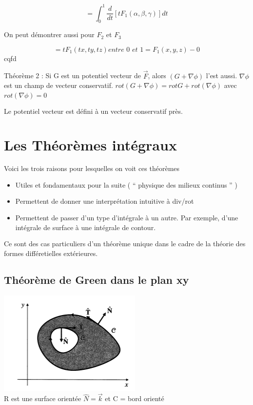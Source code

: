 \[=\int_0^1 \frac{d}{dt}[t F_1 ( \alpha, \beta, \gamma ) ] dt \]

On peut démontrer aussi pour $F_2 $ et $F_3$

\[ = tF_1 ( tx,ty,tz) \textit{entre 0 et 1} = F_1 (x,y,z) - 0\]
cqfd

\begin{myrem}

Théorème 2 : Si G est un potentiel vecteur de $\vec F$, alors $(G+\nabla \phi )$ l'est aussi. $\nabla \phi$ est un champ de vecteur conservatif.
$rot ( G+\nabla \phi )  = rot G + rot ( \nabla  \phi )$ avec $rot ( \nabla  \phi )=0$
\end{myrem}


Le potentiel vecteur est défini à un vecteur conservatif près.

\section{Les Théorèmes intégraux}


Voici les trois raisons pour lesquelles on voit ces théorèmes
\begin{itemize}
\item Utiles et fondamentaux pour la suite ( `` physique des milieux continus '' )
\item Permettent de donner une interprétation intuitive à div/rot
\item Permettent de passer d'un type d'intégrale à un autre. Par exemple, d'une intégrale de surface à une intégrale de contour.
\end{itemize}

Ce sont des cas particuliers d'un théorème unique dans le cadre de la théorie des formes différetielles extérieures.

\subsection{Théorème de Green dans le plan xy}

\includegraphics[scale=1]{image3.png}
\\
R est une surface orientée $ \hat N = \vec k$ et C = bord orienté


